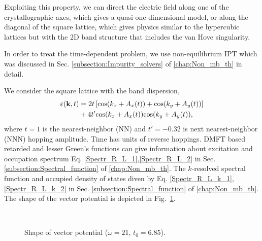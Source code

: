 Exploiting this property, we can direct the electric field along one of the crystallographic axes, which gives a quasi-one-dimensional model, 
or along the diagonal of the square lattice, which gives physics similar to the hypercubic lattices but with the 2D band structure that includes the van Hove singularity.

In order to treat the time-dependent problem, we use non-equilibrium IPT which was discussed in Sec. \ref{subsection:Impurity_solvers} of \autoref{chap:Non_mb_th} in detail.

We consider the square lattice with the band dispersion,
\begin{equation}
\begin{split}
 \varepsilon({\bf k},t)&=2t\left[{\rm cos}(k_x+A_x(t))+
{\rm cos}(k_y+A_y(t))\right]\\
 &+4t'{\rm cos}(k_x+A_x(t)) {\rm cos}(k_y+A_y(t)),
\end{split}
\label{dispersion}
\end{equation}
where $t=1$ is the nearest-neighbor (NN) and $t'=-0.32$ is next nearest-neighbor (NNN) hopping amplitude. 
Time has units of reverse hoppings. 
DMFT based retarded and lesser Green's functions can give information about excitation and occupation spectrum Eq. \eqref{Spectr_R_L_1},\eqref{Spectr_R_L_2} in Sec. \ref{subsection:Spectral_function} of \autoref{chap:Non_mb_th}. The $k$-resolved spectral function and occupied density of states diven by Eq. \eqref{Spectr_R_L_k_1},\eqref{Spectr_R_L_k_2} in Sec. \ref{subsection:Spectral_function} of \autoref{chap:Non_mb_th}.
The shape of the vector potential is depicted in Fig.~\ref{fig:A_shape_FS}.
\begin{figure}[h!]
 \\
\caption{Shape of vector potential ($\omega=21$, $t_0=6.85$).}
\label{fig:A_shape_FS}
\end{figure}
